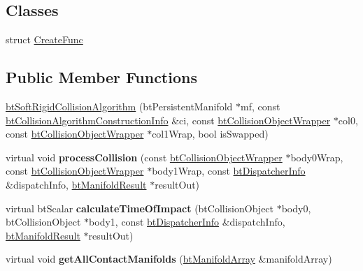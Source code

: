 \subsection*{Classes}
\begin{DoxyCompactItemize}
\item 
struct \hyperlink{structbtSoftRigidCollisionAlgorithm_1_1CreateFunc}{Create\+Func}
\end{DoxyCompactItemize}
\subsection*{Public Member Functions}
\begin{DoxyCompactItemize}
\item 
\hyperlink{classbtSoftRigidCollisionAlgorithm_aa6f289e315d626acf0a47ba093f6d4eb}{bt\+Soft\+Rigid\+Collision\+Algorithm} (bt\+Persistent\+Manifold $\ast$mf, const \hyperlink{structbtCollisionAlgorithmConstructionInfo}{bt\+Collision\+Algorithm\+Construction\+Info} \&ci, const \hyperlink{structbtCollisionObjectWrapper}{bt\+Collision\+Object\+Wrapper} $\ast$col0, const \hyperlink{structbtCollisionObjectWrapper}{bt\+Collision\+Object\+Wrapper} $\ast$col1\+Wrap, bool is\+Swapped)
\item 
\mbox{\label{classbtSoftRigidCollisionAlgorithm_ae2a70ed305793bc69865ca0ae21d4b31}} 
virtual void {\bfseries process\+Collision} (const \hyperlink{structbtCollisionObjectWrapper}{bt\+Collision\+Object\+Wrapper} $\ast$body0\+Wrap, const \hyperlink{structbtCollisionObjectWrapper}{bt\+Collision\+Object\+Wrapper} $\ast$body1\+Wrap, const \hyperlink{structbtDispatcherInfo}{bt\+Dispatcher\+Info} \&dispatch\+Info, \hyperlink{classbtManifoldResult}{bt\+Manifold\+Result} $\ast$result\+Out)
\item 
\mbox{\label{classbtSoftRigidCollisionAlgorithm_a81633f06daef836f73903d787ee71b67}} 
virtual bt\+Scalar {\bfseries calculate\+Time\+Of\+Impact} (bt\+Collision\+Object $\ast$body0, bt\+Collision\+Object $\ast$body1, const \hyperlink{structbtDispatcherInfo}{bt\+Dispatcher\+Info} \&dispatch\+Info, \hyperlink{classbtManifoldResult}{bt\+Manifold\+Result} $\ast$result\+Out)
\item 
\mbox{\label{classbtSoftRigidCollisionAlgorithm_a09c0bea1a9c7ee41ac9f67287f581f89}} 
virtual void {\bfseries get\+All\+Contact\+Manifolds} (\hyperlink{classbtAlignedObjectArray}{bt\+Manifold\+Array} \&manifold\+Array)
\end{DoxyCompactItemize}

